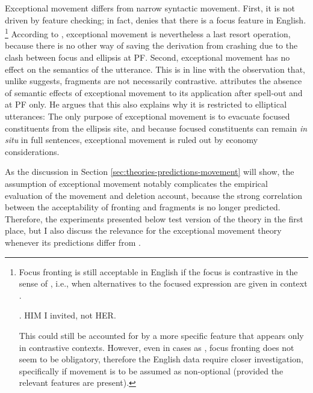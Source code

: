 \newpage
\noindent Exceptional movement differs from narrow syntactic movement. First, it is not driven by feature checking; in fact, \citet[195]{weir2014} denies that there is a focus feature in English.%
%
\footnote{Focus fronting is still acceptable in English if the focus is contrastive in the sense of \citet{krifka2007}, i.e., when alternatives to the focused expression are given in context \Next.

\ex. HIM I invited, not HER. \hfill

This could still be accounted for by a more specific feature that appears only in contrastive contexts. However, even in cases as \Last, focus fronting does not seem to be obligatory, therefore the English data require closer investigation, specifically if movement is to be assumed as non-optional (provided the relevant features are present).}\afterfn%
%
According to \citeauthor{weir2014}, exceptional movement is nevertheless a last resort operation, because there is no other way of saving the derivation from crashing due to the clash between focus and ellipsis at PF. Second, exceptional movement has no effect on the semantics of the utterance. This is in line with the observation that, unlike \citet{gengel2007} suggests, fragments are not necessarily contrastive. \citet[183]{weir2014} attributes the absence of semantic effects of exceptional movement to its application after spell-out and at PF only. He argues that this also explains why it is restricted to elliptical utterances: The only purpose of exceptional movement is to evacuate focused constituents from the ellipsis site, and because focused constituents can remain \textit{in situ} in full sentences, exceptional movement is ruled out by economy considerations.

As the discussion in Section \ref{sec:theories-predictions-movement} will show, the assumption of exceptional movement notably complicates the empirical evaluation of the movement and deletion account, because the strong correlation between the acceptability of fronting and fragments is no longer predicted. Therefore, the experiments presented below test  version of the theory in the first place, but I also discuss the relevance for the exceptional movement theory whenever its predictions differ from \citet{merchant2004}.


